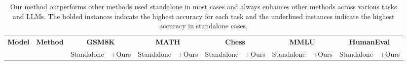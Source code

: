 \begin{table}[ht!]
\caption{Our method outperforms other methods used standalone in most cases and always enhances other methods across various tasks and LLMs. The bolded instances indicate the highest accuracy for each task and the underlined instances indicate the highest accuracy in standalone cases.}
\label{table:other_methods}
\vskip 0.15in
\begin{center}
\begin{large}
\begin{adjustbox}{width=\textwidth}
\begin{tabular}{clcccccccccc}
\toprule
\multirow{2}{*}{\textbf{Model}}   & \multirow{2}{*}{\textbf{Method}} & \multicolumn{2}{c}{\textbf{GSM8K}} & \multicolumn{2}{c}{\textbf{MATH}} & \multicolumn{2}{c}{\textbf{Chess}} & \multicolumn{2}{c}{\textbf{MMLU}} & \multicolumn{2}{c}{\textbf{HumanEval}} \\ \cmidrule{3-12}
                         &                         & Standalone     & +Ours          & Standalone    & +Ours          & Standalone     & +Ours          & Standalone    & +Ours          & Standalone       & +Ours            \\ \midrule
                         

\end{tabular}
\end{adjustbox}
\end{large}
\end{center}
\end{table}
